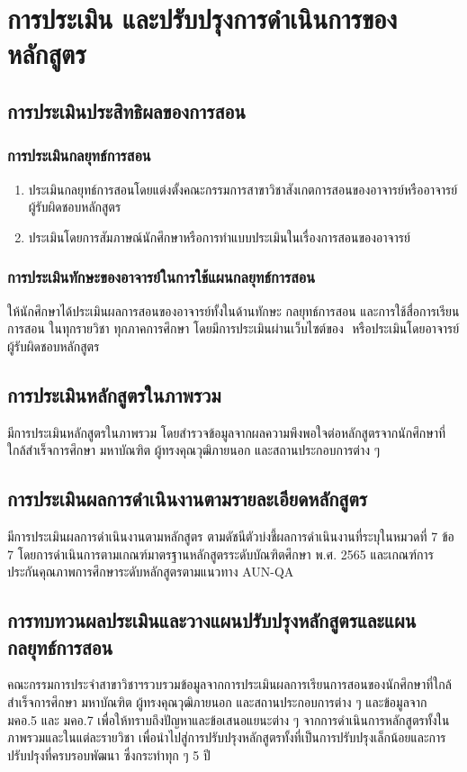 \chapter{การประเมิน และปรับปรุงการดำเนินการของหลักสูตร}

\section{การประเมินประสิทธิผลของการสอน}

\subsection{การประเมินกลยุทธ์การสอน}
\begin{enumerate}
   	\item ประเมินกลยุทธ์การสอนโดยแต่งตั้งคณะกรรมการสาขาวิชาสังเกตการสอนของอาจารย์หรืออาจารย์ผู้รับผิดชอบหลักสูตร  
   	\item ประเมินโดยการสัมภาษณ์นักศึกษาหรือการทำแบบประเมินในเรื่องการสอนของอาจารย์   
   	 \end{enumerate}  
\subsection{การประเมินทักษะของอาจารย์ในการใช้แผนกลยุทธ์การสอน}
\university ให้นักศึกษาได้ประเมินผลการสอนของอาจารย์ทั้งในด้านทักษะ กลยุทธ์การสอน และการใช้สื่อการเรียนการสอน ในทุกรายวิชา ทุกภาคการศึกษา โดยมีการประเมินผ่านเว็บไซต์ของ\university \,\, หรือประเมินโดยอาจารย์ผู้รับผิดชอบหลักสูตร

\section{การประเมินหลักสูตรในภาพรวม}
มีการประเมินหลักสูตรในภาพรวม โดยสำรวจข้อมูลจากผลความพึงพอใจต่อหลักสูตรจากนักศึกษาที่ใกล้สำเร็จการศึกษา มหาบัณฑิต ผู้ทรงคุณวุฒิภายนอก และสถานประกอบการต่าง ๆ
\section{การประเมินผลการดำเนินงานตามรายละเอียดหลักสูตร}
มีการประเมินผลการดำเนินงานตามหลักสูตร ตามดัชนีตัวบ่งชี้ผลการดำเนินงานที่ระบุในหมวดที่ 7 ข้อ 7 โดยการดำเนินการตามเกณฑ์มาตรฐานหลักสูตรระดับบัณฑิตศึกษา พ.ศ. 2565 และเกณฑ์การประกันคุณภาพการศึกษาระดับหลักสูตรตามแนวทาง AUN-QA

\section{การทบทวนผลประเมินและวางแผนปรับปรุงหลักสูตรและแผนกลยุทธ์การสอน}
คณะกรรมการประจำสาขาวิชาฯรวบรวมข้อมูลจากการประเมินผลการเรียนการสอนของนักศึกษาที่ใกล้สำเร็จการศึกษา มหาบัณฑิต ผู้ทรงคุณวุฒิภายนอก และสถานประกอบการต่าง ๆ และข้อมูลจาก มคอ.5 และ มคอ.7 เพื่อให้ทราบถึงปัญหาและข้อเสนอแยนะต่าง ๆ จากการดำเนินการหลักสูตรทั้งในภาพรวมและในแต่ละรายวิชา เพื่อนำไปสู่การปรับปรุงหลักสูตรทั้งที่เป็นการปรับปรุงเล็กน้อยและการปรับปรุงที่ครบรอบพัฒนา ซึ่งกระทำทุก ๆ 5 ปี











